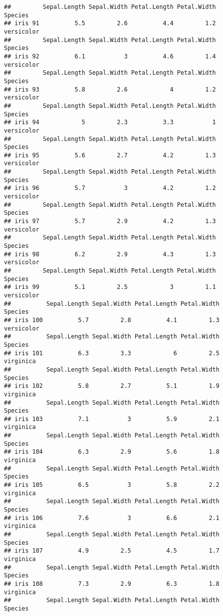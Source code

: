 \documentclass[
]{article}
\begin{document}
\begin{verbatim}
##         Sepal.Length Sepal.Width Petal.Length Petal.Width    Species
## iris 91          5.5         2.6          4.4         1.2 versicolor
##         Sepal.Length Sepal.Width Petal.Length Petal.Width    Species
## iris 92          6.1           3          4.6         1.4 versicolor
##         Sepal.Length Sepal.Width Petal.Length Petal.Width    Species
## iris 93          5.8         2.6            4         1.2 versicolor
##         Sepal.Length Sepal.Width Petal.Length Petal.Width    Species
## iris 94            5         2.3          3.3           1 versicolor
##         Sepal.Length Sepal.Width Petal.Length Petal.Width    Species
## iris 95          5.6         2.7          4.2         1.3 versicolor
##         Sepal.Length Sepal.Width Petal.Length Petal.Width    Species
## iris 96          5.7           3          4.2         1.2 versicolor
##         Sepal.Length Sepal.Width Petal.Length Petal.Width    Species
## iris 97          5.7         2.9          4.2         1.3 versicolor
##         Sepal.Length Sepal.Width Petal.Length Petal.Width    Species
## iris 98          6.2         2.9          4.3         1.3 versicolor
##         Sepal.Length Sepal.Width Petal.Length Petal.Width    Species
## iris 99          5.1         2.5            3         1.1 versicolor
##          Sepal.Length Sepal.Width Petal.Length Petal.Width    Species
## iris 100          5.7         2.8          4.1         1.3 versicolor
##          Sepal.Length Sepal.Width Petal.Length Petal.Width   Species
## iris 101          6.3         3.3            6         2.5 virginica
##          Sepal.Length Sepal.Width Petal.Length Petal.Width   Species
## iris 102          5.8         2.7          5.1         1.9 virginica
##          Sepal.Length Sepal.Width Petal.Length Petal.Width   Species
## iris 103          7.1           3          5.9         2.1 virginica
##          Sepal.Length Sepal.Width Petal.Length Petal.Width   Species
## iris 104          6.3         2.9          5.6         1.8 virginica
##          Sepal.Length Sepal.Width Petal.Length Petal.Width   Species
## iris 105          6.5           3          5.8         2.2 virginica
##          Sepal.Length Sepal.Width Petal.Length Petal.Width   Species
## iris 106          7.6           3          6.6         2.1 virginica
##          Sepal.Length Sepal.Width Petal.Length Petal.Width   Species
## iris 107          4.9         2.5          4.5         1.7 virginica
##          Sepal.Length Sepal.Width Petal.Length Petal.Width   Species
## iris 108          7.3         2.9          6.3         1.8 virginica
##          Sepal.Length Sepal.Width Petal.Length Petal.Width   Species

\end{verbatim}
\end{document}
